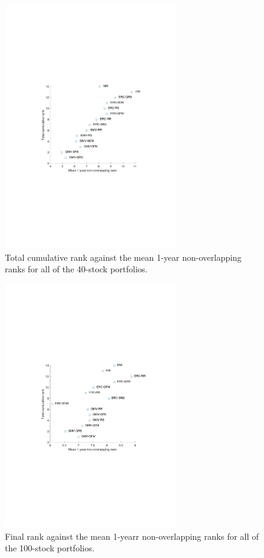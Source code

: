 \documentclass[a4paper,11pt,nocenter,bold,noupper,headcount]{mythesis}
\theoremstyle{plain}
\theoremstyle{definition}
\begin{document}
\begin{figure}[H]
\centering
\begin{center}
\includegraphics[width=7.5cm]{n40_rank_com.pdf}
\end{center}
\centering
\caption{Total cumulative rank against the mean 1-year non-overlapping ranks for all of the 40-stock portfolios.}
\label{rank_comp_40}
\end{figure}
\begin{figure}[H]
\centering
\begin{center}
\includegraphics[width=7.5cm]{n100_rank_com.pdf}
\end{center}
\centering
\caption{Final rank against the mean 1-yearr non-overlapping ranks for all of the 100-stock portfolios.}
\label{rank_comp_100}
\end{figure}
\end{document}
